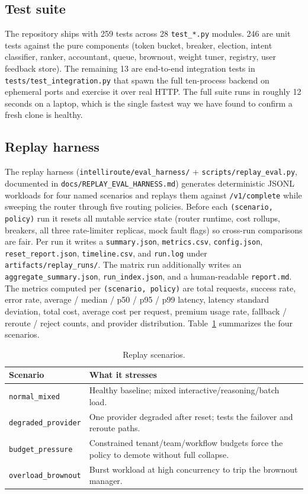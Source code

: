 \documentclass[conference,letterpaper]{IEEEtran}
\begin{document}
\subsection{Test suite}
The repository ships with 259 tests across 28 \texttt{test\_*.py}
modules. 246 are unit tests against the pure components (token
bucket, breaker, election, intent classifier, ranker, accountant,
queue, brownout, weight tuner, registry, user feedback store). The
remaining 13 are end-to-end integration tests in
\texttt{tests/test\_integration.py} that spawn the full ten-process
backend on ephemeral ports and exercise it over real HTTP. The full
suite runs in roughly 12 seconds on a laptop, which is the single
fastest way we have found to confirm a fresh clone is healthy.

\subsection{Replay harness}
The replay harness (\texttt{intelliroute/eval\_harness/} +
\texttt{scripts/replay\_eval.py}, documented in
\texttt{docs/REPLAY\_EVAL\_HARNESS.md}) generates deterministic JSONL
workloads for four named scenarios and replays them against
\texttt{/v1/complete} while sweeping the router through five routing
policies. Before each \texttt{(scenario, policy)} run it resets all
mutable service state (router runtime, cost rollups, breakers, all
three rate-limiter replicas, mock fault flags) so cross-run
comparisons are fair. Per run it writes a \texttt{summary.json},
\texttt{metrics.csv}, \texttt{config.json}, \texttt{reset\_report.json},
\texttt{timeline.csv}, and \texttt{run.log} under
\texttt{artifacts/replay\_runs/}. The matrix run additionally writes
an \texttt{aggregate\_summary.json}, \texttt{run\_index.json}, and a
human-readable \texttt{report.md}. The metrics computed per
\texttt{(scenario, policy)} are total requests, success rate, error
rate, average / median / p50 / p95 / p99 latency, latency standard
deviation, total cost, average cost per request, premium usage rate,
fallback / reroute / reject counts, and provider distribution.
Table~\ref{tab:scenarios} summarizes the four scenarios.

\begin{table}[!t]
\caption{Replay scenarios.}
\label{tab:scenarios}
\centering
\renewcommand{\arraystretch}{1.15}
\setlength{\tabcolsep}{3pt}
\begin{tabularx}{\columnwidth}{@{}l X@{}}
\toprule
Scenario              & What it stresses \\
\midrule
\texttt{normal\_mixed} &
   Healthy baseline; mixed interactive/reasoning/batch load. \\
\texttt{degraded\_provider} &
   One provider degraded after reset; tests the failover and
   reroute paths. \\
\texttt{budget\_pressure} &
   Constrained tenant/team/workflow budgets force the policy to
   demote without full collapse. \\
\texttt{overload\_brownout} &
   Burst workload at high concurrency to trip the brownout
   manager. \\
\bottomrule
\end{tabularx}
\end{table}
\end{document}
